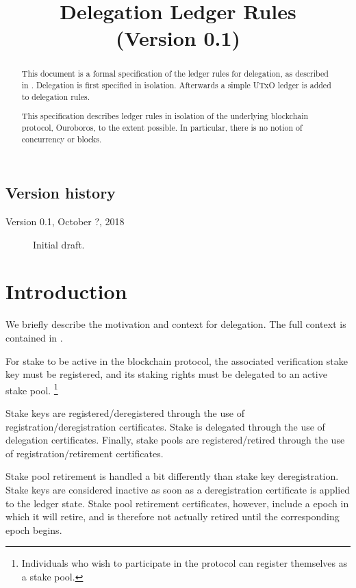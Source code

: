 \documentclass[11pt,a4paper]{article}
\begin{document}
\title{Delegation Ledger Rules \\
       {\small (Version 0.1)}}
\author{}

\maketitle

\begin{abstract}
This document is a formal specification of the ledger rules for delegation,
as described in \cite{delegation_design}.
Delegation is first specified in isolation.
Afterwards a simple UTxO ledger is added to delegation rules.

This specification describes ledger rules in isolation of the
underlying blockchain protocol, Ouroboros, to the extent possible.
In particular, there is no notion of concurrency or blocks.

\end{abstract}

\tableofcontents
\listoffigures

\subsection*{Version history}

\begin{description}
\item[Version 0.1, October ?, 2018] Initial draft.
\end{description}

\section{Introduction}

We briefly describe the motivation and context for delegation.
The full context is contained in \cite{delegation_design}.

For stake to be active in the blockchain protocol,
the associated verification stake key must be registered,
and its staking rights must be delegated to an active stake pool.
\footnote{Individuals who wish to participate in the protocol can
register themselves as a stake pool.}

Stake keys are registered/deregistered through the use of
registration/deregistration certificates.
Stake is delegated through the use of delegation certificates.
Finally, stake pools are registered/retired through the use of
registration/retirement certificates.

Stake pool retirement is handled a bit differently than stake key deregistration.
Stake keys are considered inactive as soon as a deregistration certificate
is applied to the ledger state.
Stake pool retirement certificates, however, include a epoch in which it will retire,
and is therefore not actually retired until the corresponding epoch begins.
\end{document}
